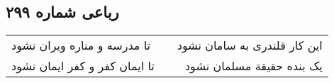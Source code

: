 \begin{center}
\section*{رباعی شماره ۲۹۹}
\label{sec:sh299}
\begin{longtable}{l p{0.5cm} r}
تا مدرسه و مناره ویران نشود
&&
این کار قلندری به سامان نشود
\\
تا ایمان کفر و کفر ایمان نشود
&&
یک بنده حقیقة مسلمان نشود
\\
\end{longtable}
\end{center}
